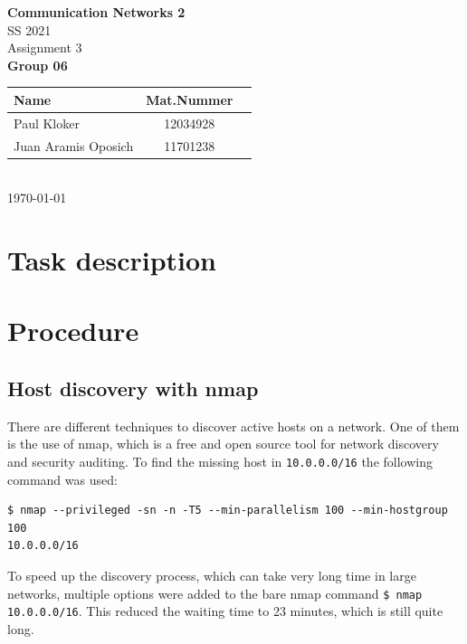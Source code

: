 \documentclass[parskip=full]{scrartcl}
\begin{document}
\begin{titlepage}
    \centering
    \vspace*{2cm}
    {\Huge \textbf{Communication Networks 2}}\\
    SS 2021\\
    \vspace*{1cm}
    {\Large Assignment 3}
    \\\vspace*{3cm}
    {\Large \textbf{Group 06}}\\
    \vspace*{1cm}
    {\large 
        \begin{tabular}{l c c}
            Name & Mat.Nummer \\ \hline
            Paul Kloker & 12034928 \\
            Juan Aramis Oposich & 11701238
        \end{tabular}
    }
    \\\vspace*{7cm}
    \today
\end{titlepage}

\section{Task description} \label{sec:task}

\section{Procedure} \label{sec:procedure}

\subsection{Host discovery with nmap} \label{subsec:nmap}
There are different techniques to discover active hosts on a network.
One of them is the use of nmap, which is a free and open source tool for network discovery and security auditing.
To find the missing host in \verb|10.0.0.0/16| the following command was used:
\begin{verbatim}
$ nmap --privileged -sn -n -T5 --min-parallelism 100 --min-hostgroup 100 
10.0.0.0/16
\end{verbatim}
To speed up the discovery process, which can take very long time in large networks, multiple options were added to the bare nmap command \verb|$ nmap 10.0.0.0/16|.
This reduced the waiting time to 23 minutes, which is still quite long. 
\end{document}
